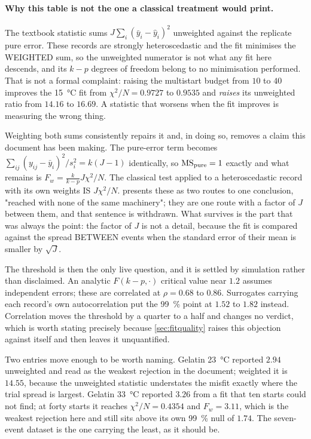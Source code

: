 \documentclass[10pt]{article}
\begin{document}
\paragraph{Why this table is not the one a classical treatment would print.} The textbook
statistic sums $J\sum_i(\bar y_i - \hat y_i)^2$ unweighted against the replicate pure error.
These records are strongly heteroscedastic and the fit minimises the WEIGHTED sum, so the
unweighted numerator is not what any fit here descends, and its $k-p$ degrees of freedom belong
to no minimisation performed. That is not a formal complaint: raising the multistart budget from
$10$ to $40$ improves the \SI{15}{\celsius} fit from $\chi^2/N = 0.9727$ to $0.9535$ and
\emph{raises} its unweighted ratio from $14.16$ to $16.69$. A statistic that worsens when the fit
improves is measuring the wrong thing.

Weighting both sums consistently repairs it and, in doing so, removes a claim this document has
been making. The pure-error term becomes $\sum_{ij}(y_{ij}-\bar y_i)^2/s_i^2 = k(J-1)$
identically, so $\mathrm{MS}_{\rm pure} = 1$ exactly and what remains is
$F_w = \tfrac{k}{k-p}J\chi^2/N$. The classical test applied to a heteroscedastic record with its
own weights IS $J\chi^2/N$.  presents these as two routes to one
conclusion, "reached with none of the same machinery"; they are one route with a factor of $J$
between them, and that sentence is withdrawn. What survives is the part that was always the
point: the factor of $J$ is not a detail, because the fit is compared against the spread BETWEEN
events when the standard error of their mean is smaller by $\sqrt{J}$.

The threshold is then the only live question, and it is settled by simulation rather than
disclaimed. An analytic $F(k-p,\cdot)$ critical value near $1.2$ assumes independent errors;
these are correlated at $\rho = 0.68$ to $0.86$. Surrogates carrying each record's own
autocorrelation put the \SI{99}{\percent} point at $1.52$ to $1.82$ instead. Correlation moves
the threshold by a quarter to a half and changes no verdict, which is worth stating precisely
because \cref{sec:fitquality} raises this objection against itself and then leaves it
unquantified.

Two entries move enough to be worth naming. Gelatin \SI{23}{\celsius} reported $2.94$ unweighted
and read as the weakest rejection in the document; weighted it is $14.55$, because the unweighted
statistic understates the misfit exactly where the trial spread is largest. Gelatin
\SI{33}{\celsius} reported $3.26$ from a fit that ten starts could not find; at forty starts it
reaches $\chi^2/N = 0.4354$ and $F_w = 3.11$, which is the weakest rejection here and still sits
above its own \SI{99}{\percent} null of $1.74$. The seven-event dataset is the one carrying the
least, as it should be.
\end{document}
